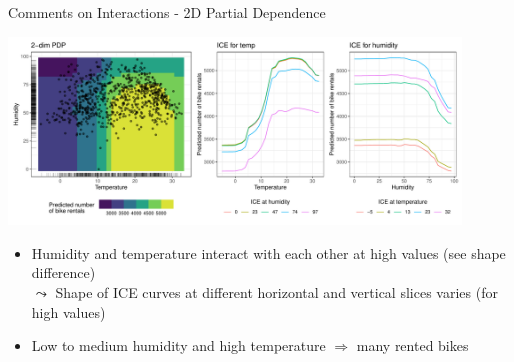 \documentclass[11pt,compress,t,notes=noshow, aspectratio=169, xcolor=table]{beamer}
\begin{document}
\begin{frame}{Comments on Interactions - 2D Partial Dependence}

\begin{center}
\includegraphics[width=0.9\textwidth]{figure/pdp2d_bike}
\end{center}

\begin{itemize}
 \item Humidity and temperature interact with each other at high values (see shape difference)\\
 $\leadsto$ Shape of ICE curves at different horizontal and vertical slices varies (for high values)
 \item Low to medium humidity and high temperature $\Rightarrow$ many rented bikes
\end{itemize}


%

\end{frame}
\end{document}
